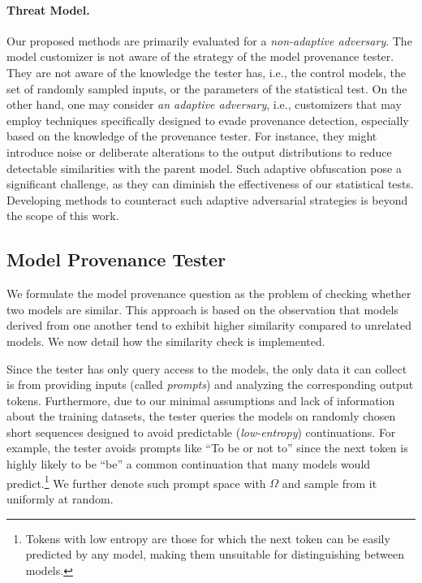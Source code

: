 \paragraph{Threat Model.} Our proposed methods are primarily evaluated for a {\em non-adaptive adversary}. The model customizer is not aware of the strategy of the model provenance tester.
%
They are not aware of the knowledge the tester has, i.e., the control models, the set of randomly sampled inputs, or the parameters of the statistical test.
%
%
On the other hand, one may consider  {\em an adaptive adversary}, i.e.,  customizers that may employ techniques specifically designed to evade provenance detection, especially based on the knowledge of the provenance tester. For instance, they might introduce noise or deliberate alterations to the output distributions to reduce detectable similarities with the parent model. Such adaptive obfuscation pose a significant challenge, as they can diminish the effectiveness of our statistical tests. Developing methods to counteract such adaptive adversarial strategies is beyond the scope of this work.


%
%
%
%
%

%
%


\subsection{Model Provenance Tester}

%
%
%
%
%

We formulate the model provenance question as the problem of checking whether two models are similar. This approach is based on the observation that models derived from one another tend to exhibit higher similarity compared to unrelated models. We now detail how the similarity check is implemented.


Since the tester has only query access to the models, the only data it can collect is from providing inputs (called \emph{prompts}) and analyzing the corresponding output tokens. Furthermore, due to our minimal assumptions and lack of information about the training datasets, the tester queries the models on randomly chosen short sequences designed to avoid predictable (\emph{low-entropy}) continuations. 
For example, the tester avoids prompts like ``To be or not to'' since the next token is highly likely to be ``be'' a common continuation that many models would predict.\footnote{Tokens with low entropy are those for which the next token can be easily predicted by any model, making them unsuitable for distinguishing between models.}
We further denote such prompt space with $\Omega$ and sample from it uniformly at random.



